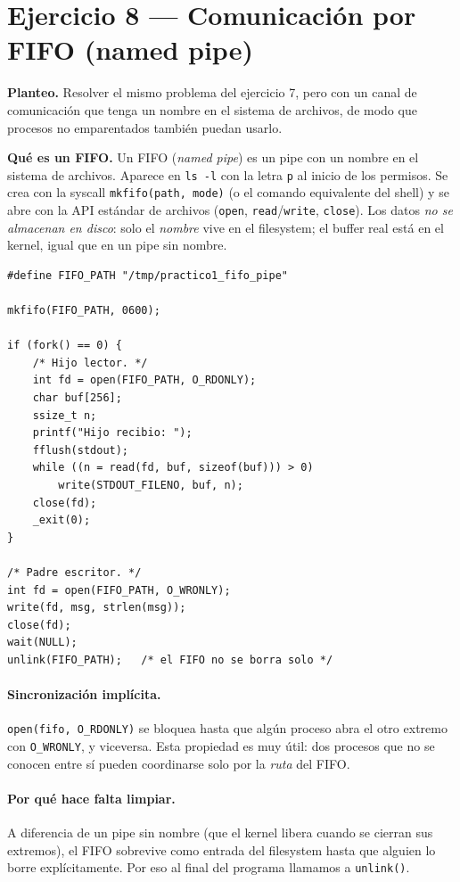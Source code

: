 \documentclass[11pt,a4paper]{article}
\begin{document}
\section{Ejercicio 8 --- Comunicación por FIFO (named pipe)}

\textbf{Planteo.} Resolver el mismo problema del ejercicio 7, pero
con un canal de comunicación que tenga un nombre en el sistema de
archivos, de modo que procesos no emparentados también puedan usarlo.

\textbf{Qué es un FIFO.} Un FIFO (\emph{named pipe}) es un pipe con
un nombre en el sistema de archivos. Aparece en \texttt{ls -l} con la
letra \texttt{p} al inicio de los permisos. Se crea con la syscall
\texttt{mkfifo(path, mode)} (o el comando equivalente del shell) y se
abre con la API estándar de archivos (\texttt{open},
\texttt{read}/\texttt{write}, \texttt{close}). Los datos
\emph{no se almacenan en disco}: solo el \emph{nombre} vive en el
filesystem; el buffer real está en el kernel, igual que en un pipe sin
nombre.

\begin{lstlisting}[style=cstyle]
#define FIFO_PATH "/tmp/practico1_fifo_pipe"

mkfifo(FIFO_PATH, 0600);

if (fork() == 0) {
    /* Hijo lector. */
    int fd = open(FIFO_PATH, O_RDONLY);
    char buf[256];
    ssize_t n;
    printf("Hijo recibio: ");
    fflush(stdout);
    while ((n = read(fd, buf, sizeof(buf))) > 0)
        write(STDOUT_FILENO, buf, n);
    close(fd);
    _exit(0);
}

/* Padre escritor. */
int fd = open(FIFO_PATH, O_WRONLY);
write(fd, msg, strlen(msg));
close(fd);
wait(NULL);
unlink(FIFO_PATH);   /* el FIFO no se borra solo */
\end{lstlisting}

\paragraph{Sincronización implícita.}
\texttt{open(fifo, O\_RDONLY)} se bloquea hasta que algún proceso abra
el otro extremo con \texttt{O\_WRONLY}, y viceversa. Esta propiedad es
muy útil: dos procesos que no se conocen entre sí pueden coordinarse
solo por la \emph{ruta} del FIFO.

\paragraph{Por qué hace falta limpiar.}
A diferencia de un pipe sin nombre (que el kernel libera cuando se
cierran sus extremos), el FIFO sobrevive como entrada del filesystem
hasta que alguien lo borre explícitamente. Por eso al final del
programa llamamos a \texttt{unlink()}.
\end{document}
